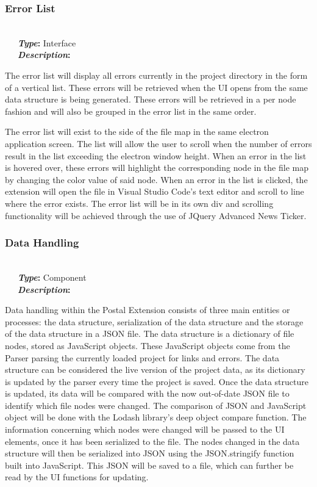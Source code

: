 \documentclass[letterpaper,10pt,titlepage,draftclsnofoot,onecolumn,onesided] {IEEEtran}
\newcommand{\bolditin}[2]{
	\-\ \-\ \-\ \textbf{\textit{#1}#2}
}
\begin{document}
\subsubsection{Error List} \hfill \\
\bolditin{Type}{:} Interface \\
\bolditin{Description}{:} 
The error list will display all errors currently in the project directory in the form of a vertical list. 
These errors will be retrieved when the UI opens from the same data structure is being generated. 
These errors will be retrieved in a per node fashion and will also be grouped in the error list in the same order. 

The error list will exist to the side of the file map in the same electron application screen. 
The list will allow the user to scroll when the number of errors result in the list exceeding the electron window height. 
When an error in the list is hovered over, these errors will highlight the corresponding node in the file map by changing the color value of said node. 
When an error in the list is clicked, the extension will open the file in Visual Studio Code's text editor and scroll to line where the error exists.
The error list will be in its own div and scrolling functionality will be achieved through the use of JQuery Advanced News Ticker. \cite{newst}
	
\subsubsection{Data Handling} \hfill \\
\bolditin{Type}{:} Component \\
\bolditin{Description}{:} 
Data handling within the Postal Extension consists of three main entities or processes: the data structure, serialization of the data structure and the storage of the data structure in a JSON file.
The data structure is a dictionary of file nodes, stored as JavaScript objects. These JavaScript objects come from the Parser parsing the currently loaded project for links and errors.
The data structure can be considered the live version of the project data, as its dictionary is updated by the parser every time the project is saved. 
Once the data structure is updated, its data will be compared with the now out-of-date JSON file to identify which file nodes were changed.
The comparison of JSON and JavaScript object will be done with the Lodash library's deep object compare function.
The information concerning which nodes were changed will be passed to the UI elements, once it has been serialized to the file.
The nodes changed in the data structure will then be serialized into JSON using the JSON.stringify function built into JavaScript.
This JSON will be saved to a file, which can further be read by the UI functions for updating. \cite{stringify} \cite{lodash}
	
\end{document}
